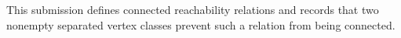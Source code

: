 This submission defines connected reachability relations and records that two nonempty separated vertex classes prevent such a relation from being connected.
